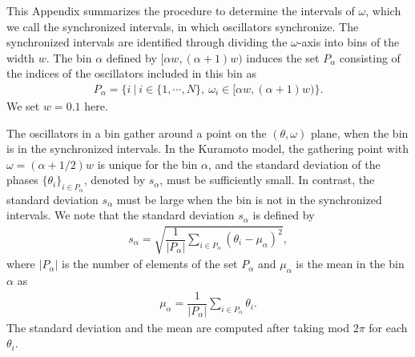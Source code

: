 


This Appendix summarizes the procedure to determine the intervals
of $\omega$, which we call the synchronized intervals,
in which oscillators synchronize.
The synchronized intervals are identified
through dividing the $\omega$-axis into bins of the width $w$.
The bin $\alpha$ defined by $[\alpha w, (\alpha+1)w)$
induces the set $P_{\alpha}$ consisting of the indices
of the oscillators included in this bin as
\begin{align}
  P_{\alpha} = \{ i~|~ i\in\{1,\cdots,N\},~
  \omega_{i} \in [\alpha w, (\alpha+1) w) \}.
\end{align}
We set $w=0.1$ here.

The oscillators in a bin gather around a point on the $(\theta,\omega)$ plane,
when the bin is in the synchronized intervals.
In the Kuramoto model, the gathering point with $\omega=(\alpha+1/2)w$
is unique for the bin $\alpha$,
and the standard deviation of the phases $\{\theta_{i}\}_{i\in P_{\alpha}}$,
denoted by $s_{\alpha}$, must be sufficiently small.
In contrast, the standard deviation $s_{\alpha}$ must be large
when the bin is not in the synchronized intervals.
We note that the standard deviation $s_{\alpha}$ is defined by
\begin{align}
  s_{\alpha}
  = \sqrt{ \dfrac{1}{|P_{\alpha}|} \sum_{i\in P_{\alpha}}
    (\theta_{i}-\mu_{\alpha})^{2} },
\end{align}
where $|P_{\alpha}|$ is the number of elements of the set $P_{\alpha}$
and $\mu_{\alpha}$ is the mean in the bin $\alpha$ as
\begin{align}
  \mu_{\alpha} = \dfrac{1}{|P_{\alpha}|} \sum_{i\in P_{\alpha}} \theta_{i}.
\end{align}
The standard deviation and the mean are computed
after taking mod $2\pi$ for each $\theta_{i}$.

